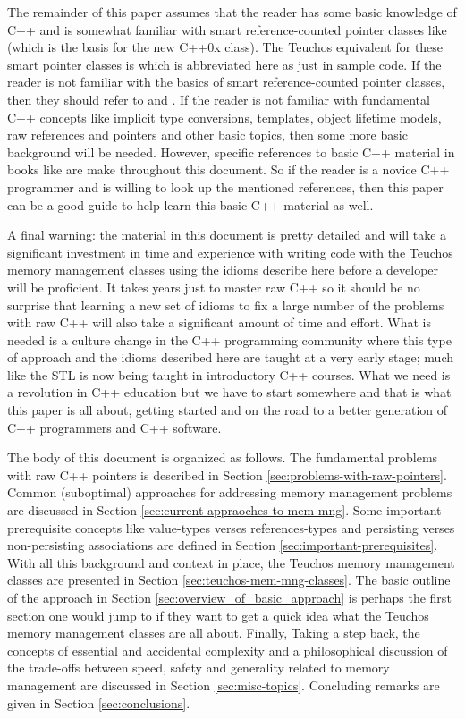 \documentclass[pdf,ps2pdf,11pt]{SANDreport}
\begin{document}
The remainder of this paper assumes that the reader has some basic knowledge
of C++ and is somewhat familiar with smart reference-counted pointer classes
like {} (which is the basis for the new C++0x
{} class).  The Teuchos equivalent for these smart
pointer classes is {} which is abbreviated here as just
{} in sample code.  If the reader is not familiar with the basics of
smart reference-counted pointer classes, then they should refer to
{}\cite{RefCountPtrBeginnersGuide} and {}\cite{C++CodingStandards05}.  If the
reader is not familiar with fundamental C++ concepts like implicit type
conversions, templates, object lifetime models, raw references and pointers
and other basic topics, then some more basic background will be needed.
However, specific references to basic C++ material in books like
{}\cite{EffectiveC++ThirdEdition, stroustrup97, C++CodingStandards05} are make
throughout this document.  So if the reader is a novice C++ programmer and is
willing to look up the mentioned references, then this paper can be a good
guide to help learn this basic C++ material as well.

A final warning: the material in this document is pretty detailed and will
take a significant investment in time and experience with writing code with
the Teuchos memory management classes using the idioms describe here before a
developer will be proficient.  It takes years just to master raw C++ so it
should be no surprise that learning a new set of idioms to fix a large number
of the problems with raw C++ will also take a significant amount of time and
effort.  What is needed is a culture change in the C++ programming community
where this type of approach and the idioms described here are taught at a very
early stage; much like the STL is now being taught in introductory C++
courses.  What we need is a revolution in C++ education but we have to start
somewhere and that is what this paper is all about, getting started and on the
road to a better generation of C++ programmers and C++ software.

The body of this document is organized as follows. The fundamental problems
with raw C++ pointers is described in Section
{}\ref{sec:problems-with-raw-pointers}.  Common (suboptimal) approaches for
addressing memory management problems are discussed in Section
{}\ref{sec:current-appraoches-to-mem-mng}.  Some important prerequisite
concepts like value-types verses references-types and persisting verses
non-persisting associations are defined in Section
{}\ref{sec:important-prerequisites}.  With all this background and context in
place, the Teuchos memory management classes are presented in Section
{}\ref{sec:teuchos-mem-mng-classes}.  The basic outline of the approach in
Section {}\ref{sec:overview_of_basic_approach} is perhaps the first section
one would jump to if they want to get a quick idea what the Teuchos memory
management classes are all about.  Finally, Taking a step back, the concepts
of essential and accidental complexity and a philosophical discussion of the
trade-offs between speed, safety and generality related to memory management
are discussed in Section {}\ref{sec:misc-topics}.  Concluding remarks are
given in Section {}\ref{sec:conclusions}.
\end{document}
